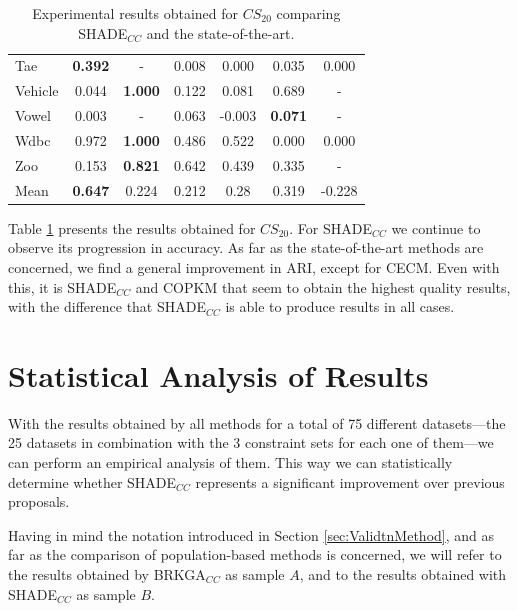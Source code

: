 \documentclass[review]{elsarticle}
\begin{document}
\begin{table}[!h]
{\begin{tabular}{lcccccc}
			Tae & \textbf{0.392} & - & 0.008 & 0.000 & 0.035 & 0.000 \\
			Vehicle & 0.044 & \textbf{1.000} & 0.122 & 0.081 & 0.689 & - \\
			Vowel & 0.003 & - & 0.063 & -0.003 & \textbf{0.071} & - \\
			Wdbc & 0.972 & \textbf{1.000} & 0.486 & 0.522 & 0.000 & 0.000 \\
			Zoo & 0.153 & \textbf{0.821} & 0.642 & 0.439 & 0.335 & - \\
			\hline
			Mean  & \textbf{0.647} & 0.224 & 0.212 & 0.28 & 0.319 & -0.228 \\
			\hline
		\end{tabular}}
		
	\caption{Experimental results obtained for $CS_{20}$ comparing SHADE$_{CC}$ and the state-of-the-art.}
	\label{tab:results20SOTA}
\end{table}

Table \ref{tab:results20SOTA} presents the results obtained for $CS_{20}$. For SHADE$_{CC}$ we continue to observe its progression in accuracy. As far as the state-of-the-art methods are concerned, we find a general improvement in ARI, except for CECM. Even with this, it is SHADE$_{CC}$ and COPKM that seem to obtain the highest quality results, with the difference that SHADE$_{CC}$ is able to produce results in all cases.

\clearpage

\section{Statistical Analysis of Results} \label{sec:analisis}

With the results obtained by all methods for a total of 75 different datasets---the 25 datasets in combination with the 3 constraint sets for each one of them---we can perform an empirical analysis of them. This way we can statistically determine whether SHADE$_{CC}$ represents a significant improvement over previous proposals.

Having in mind the notation introduced in Section \ref{sec:ValidtnMethod}, and as far as the comparison of population-based methods is concerned, we will refer to the results obtained by BRKGA$_{CC}$ as sample $A$, and to the results obtained with SHADE$_{CC}$ as sample $B$.
\end{document}
